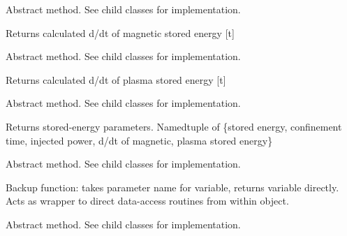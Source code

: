\documentclass[letterpaper,10pt,english]{sphinxmanual}
\begin{document}
\begin{fulllineitems}
\begin{fulllineitems}
\label{eqtools:eqtools.core.Equilibrium.getWbdot}
Abstract method.  See child classes for implementation.

Returns calculated d/dt of magnetic stored energy {[}t{]}

\end{fulllineitems}


\begin{fulllineitems}
\label{eqtools:eqtools.core.Equilibrium.getWpdot}
Abstract method.  See child classes for implementation.

Returns calculated d/dt of plasma stored energy {[}t{]}

\end{fulllineitems}


\begin{fulllineitems}
\label{eqtools:eqtools.core.Equilibrium.getEnergy}
Abstract method.  See child classes for implementation.

Returns stored-energy parameters.
Namedtuple of \{stored energy, confinement time, injected power, d/dt of magnetic, plasma stored energy\}

\end{fulllineitems}


\begin{fulllineitems}
\label{eqtools:eqtools.core.Equilibrium.getParam}
Abstract method.  See child classes for implementation.

Backup function: takes parameter name for variable, returns variable directly.
Acts as wrapper to direct data-access routines from within object.

\end{fulllineitems}


\begin{fulllineitems}
\label{eqtools:eqtools.core.Equilibrium.getMachineCrossSection}
Abstract method.  See child classes for implementation.


\end{fulllineitems}
\end{fulllineitems}
\end{document}
